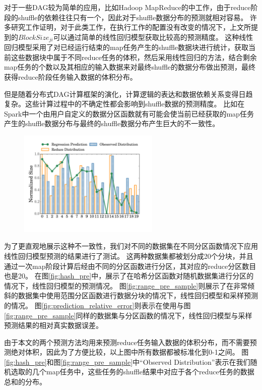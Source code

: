 对于一些DAG较为简单的应用，比如Hadoop MapReduce的中工作\cite{hadoop}，由于reduce阶段的shuffle的依赖往往只有一个，因此对于shuffle数据分布的预测就相对容易。
许多研究工作证明，对于此类工作，在执行工作的配置没有改变的情况下，上文所提到的$BlockSize_{ji}$可以通过简单的线性回归模型获取比较高的预测精度\cite{ishuffle, predict}。
这种线性回归模型采用了对已经运行结束的map任务产生的shuffle数据块进行统计，获取当前这些数据块中属于不同reduce任务的体积，然后采用线性回归的方法，结合剩余map任务的个数以及其相应的输入数据来对最终shuffle的数据分布做出预测，最终获得reduce阶段任务输入数据的体积分布。

但是随着分布式DAG计算框架的演化，计算逻辑的表达和数据依赖关系变得日趋复杂。这些计算过程中的不确定性都会影响到shuffle数据的预测精度。
比如在Spark中一个由用户自定义的数据分区函数就有可能会使当前已经获取的map任务产生的shuffle数据分布与最终的shuffle数据分布产生巨大的不一致性。
\begin{figure}[!htp]
    \centering
    \includegraphics[width=0.6\textwidth]{../../PPoPP-2018/fig/hash_pre.pdf}
\end{figure}

为了更直观地展示这种不一致性，我们对不同的数据集在不同分区函数情况下应用线性回归模型预测的结果进行了测试。
这两种数据集都被划分成20个分块，并且通过一次map阶段计算后经由不同的分区函数进行分区，其对应的reduce分区数目也是20。
在图\ref{fig:hash_pre}中，展示了在哈希分区函数对随机数据集进行分区的情况下，线性回归模型的预测情况。
图\ref{fig:range_pre_sample}则展示了在非常倾斜的数据集中使用范围分区函数进行数据分块的情况下，线性回归模型和采样预测的情况。
图\ref{fig:prediction_relative_error}则表示在使用与图\ref{fig:range_pre_sample}同样的数据集与分区函数的情况下，线性回归模型与采样预测结果的相对真实数据误差。

由于本文的两个预测方法均用来预测reduce任务输入数据的体积分布，而不需要预测绝对体积，因此为了方便比较，以上图中所有数据都被标准化到0-1之间。
图\ref{fig:hash_pre}和图\ref{fig:range_pre_sample}中“Observed Distribution”表示在我们随机选取的几个map任务中，这些任务的shuffle结果中对应于各个reduce任务的数据总和的分布。

